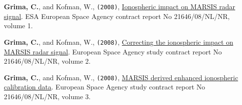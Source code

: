 \begin{etaremune}
\item
  \textbf{Grima, C.}, and Kofman, W., \texttt{(2008)}, \href{https://archives.esac.esa.int/psa/ftp/MARS-EXPRESS/MARSIS/MEX-M-MARSIS-5-DDR-SS-TEC-V1.0/DOCUMENT/IONOPROCESS_REPORT1.PDF}{Ionospheric impact on MARSIS radar signal}. ESA European Space Agency contract report No 21646/08/NL/NR, volume 1.
\item
  \textbf{Grima, C.}, and Kofman, W., \texttt{(2008)}, \href{https://archives.esac.esa.int/psa/ftp/MARS-EXPRESS/MARSIS/MEX-M-MARSIS-5-DDR-SS-TEC-V1.0/DOCUMENT/IONOPROCESS_REPORT2.PDF}{Correcting
  the ionospheric impact on MARSIS radar signal}. European Space Agency
  study contract report No 21646/08/NL/NR, volume 2.
\item
  \textbf{Grima, C.}, and Kofman, W., \texttt{(2008)}, \href{https://archives.esac.esa.int/psa/ftp/MARS-EXPRESS/MARSIS/MEX-M-MARSIS-5-DDR-SS-TEC-V1.0/DOCUMENT/IONOPROCESS_REPORT3.PDF}{MARSIS
  derived enhanced ionospheric calibration data}. European Space Agency
  study contract report No 21646/08/NL/NR, volume 3.
\end{etaremune}
